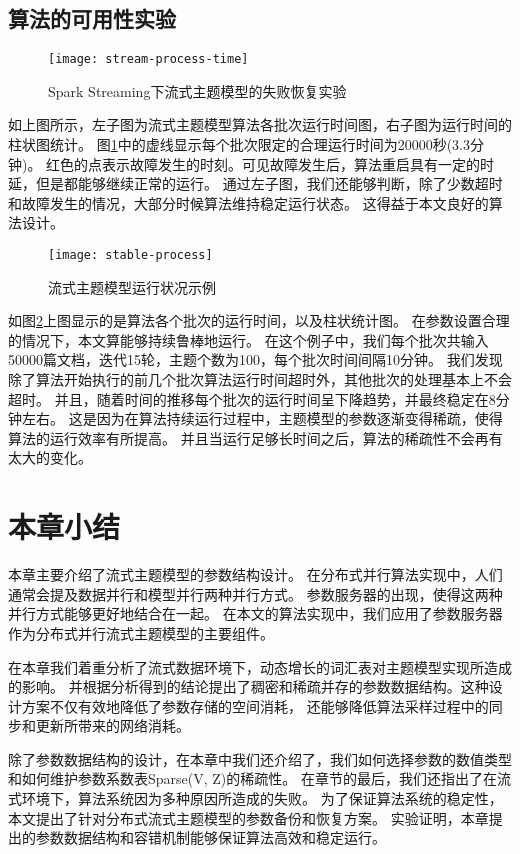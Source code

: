 \subsection{算法的可用性实验}
\begin{figure}[htb]\centering
\texttt{[image: stream-process-time]}
\caption{Spark Streaming下流式主题模型的失败恢复实验}
\label{fig:stream-process-time}       %
\end{figure}
如上图所示，左子图为流式主题模型算法各批次运行时间图，右子图为运行时间的柱状图统计。
图\ref{fig:stream-process-time}中的虚线显示每个批次限定的合理运行时间为20000秒(3.3分钟)。
红色的点表示故障发生的时刻。可见故障发生后，算法重启具有一定的时延，但是都能够继续正常的运行。
通过左子图，我们还能够判断，除了少数超时和故障发生的情况，大部分时候算法维持稳定运行状态。
这得益于本文良好的算法设计。

\begin{figure}[htb]\centering
\texttt{[image: stable-process]}
\caption{流式主题模型运行状况示例}
\label{fig:stable-process}       %
\end{figure}

如图\ref{fig:stable-process}上图显示的是算法各个批次的运行时间，以及柱状统计图。
在参数设置合理的情况下，本文算能够持续鲁棒地运行。
在这个例子中，我们每个批次共输入50000篇文档，迭代15轮，主题个数为100，每个批次时间间隔10分钟。
我们发现除了算法开始执行的前几个批次算法运行时间超时外，其他批次的处理基本上不会超时。
并且，随着时间的推移每个批次的运行时间呈下降趋势，并最终稳定在8分钟左右。
这是因为在算法持续运行过程中，主题模型的参数逐渐变得稀疏，使得算法的运行效率有所提高。
并且当运行足够长时间之后，算法的稀疏性不会再有太大的变化。

\section{本章小结}
本章主要介绍了流式主题模型的参数结构设计。
在分布式并行算法实现中，人们通常会提及数据并行和模型并行两种并行方式。
参数服务器的出现，使得这两种并行方式能够更好地结合在一起。
在本文的算法实现中，我们应用了参数服务器作为分布式并行流式主题模型的主要组件。

在本章我们着重分析了流式数据环境下，动态增长的词汇表对主题模型实现所造成的影响。
并根据分析得到的结论提出了稠密和稀疏并存的参数数据结构。这种设计方案不仅有效地降低了参数存储的空间消耗，
还能够降低算法采样过程中的同步和更新所带来的网络消耗。

除了参数数据结构的设计，在本章中我们还介绍了，我们如何选择参数的数值类型和如何维护参数系数表Sparse(V, Z)的稀疏性。
在章节的最后，我们还指出了在流式环境下，算法系统因为多种原因所造成的失败。
为了保证算法系统的稳定性，本文提出了针对分布式流式主题模型的参数备份和恢复方案。
实验证明，本章提出的参数数据结构和容错机制能够保证算法高效和稳定运行。

